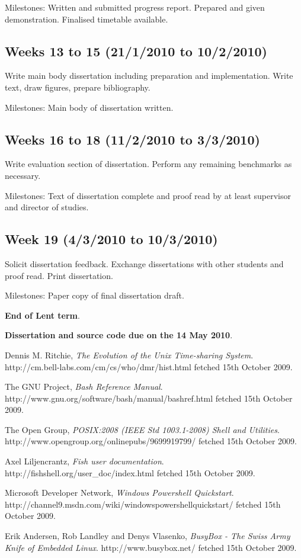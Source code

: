 \documentclass[12pt]{article}
\begin{document}
Milestones: Written and submitted progress report. Prepared and given
demonstration. Finalised timetable available.

\subsection*{Weeks 13 to 15 (21/1/2010 to 10/2/2010)}
Write main body dissertation including preparation and
implementation. Write text, draw figures, prepare bibliography.

Milestones: Main body of dissertation written.

\subsection*{Weeks 16 to 18 (11/2/2010 to 3/3/2010)}
Write evaluation section of dissertation. Perform any remaining
benchmarks as necessary.

Milestones: Text of dissertation complete and proof read by at
least supervisor and director of studies.

\subsection*{Week 19 (4/3/2010 to 10/3/2010)}
Solicit dissertation feedback. Exchange dissertations with other
students and proof read. Print dissertation.

Milestones: Paper copy of final dissertation draft.

{\bf End of Lent term}.

{\bf Dissertation and source code due on the 14 May 2010}.


\begin{thebibliography}{9} %

  Dennis M. Ritchie,
  \emph{The Evolution of the Unix Time-sharing System}.
  http://cm.bell-labs.com/cm/cs/who/dmr/hist.html fetched 15th October
  2009.

  The GNU Project,
  \emph{Bash Reference Manual}.
  http://www.gnu.org/software/bash/manual/bashref.html fetched 15th
  October 2009.
 
  The Open Group,
  \emph{POSIX:2008 (IEEE Std 1003.1-2008) Shell and Utilities}.
  http://www.opengroup.org/onlinepubs/9699919799/ fetched 15th October
  2009.

  Axel Liljencrantz,
  \emph{Fish user documentation}.
  http://fishshell.org/user\_doc/index.html fetched 15th October 2009.

  Microsoft Developer Network,
  \emph{Windows Powershell Quickstart}.
  http://channel9.msdn.com/wiki/windowspowershellquickstart/ fetched
  15th October 2009.

  Erik Andersen, Rob Landley and Denys Vlasenko,
  \emph{BusyBox - The Swiss Army Knife of Embedded Linux}.
  http://www.busybox.net/ fetched 15th October 2009.

\end{thebibliography}
\end{document}
